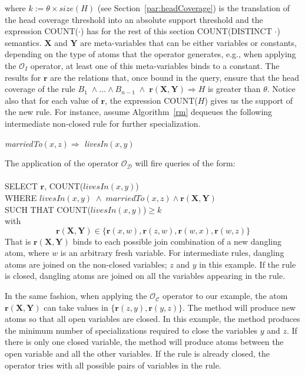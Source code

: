 \noindent where $k := \theta \times size(H)$ (see Section~\ref{par:headCoverage}) is the translation of the
head coverage threshold into an absolute support threshold and the expression COUNT($\cdot$) has for the rest of this section COUNT(DISTINCT $\cdot$) semantics.
$\bm{X}$ and $\bm{Y}$ are meta-variables that
can be either variables or constants, 
depending on the type of atoms that the operator generates, e.g., when applying the $\mathcal{O}_I$ operator, 
at least one of this meta-variables binds to a constant.
The results for $\bm{r}$ are the relations that, once bound in the query, ensure that the head coverage 
of the rule $B_1 \; \wedge ... \wedge B_{n-1} \;\wedge\; \bm{r}(\bm{X},\bm{Y}) \Rightarrow H$ is greater than $\theta$.
Notice also that for each value of $\bm{r}$, the expression COUNT($H$) gives us the support of the new rule.
For instance, assume Algorithm~\ref{rm} dequeues the following intermediate non-closed rule for further specialization.

\begin{center}
\emph{marriedTo}$(x,z) \Rightarrow $ \emph{livesIn}$(x,y)$
\end{center}

\noindent
The application of the operator $\mathcal{O_D}$ will fire queries of the form:\\ \\
SELECT $\bm{r}$, COUNT($livesIn(x,y)$) \\
WHERE $livesIn(x,y) \; \wedge \; marriedTo(x,z) \wedge \bm{r}(\bm{X}, \bm{Y})$\\
SUCH THAT COUNT($livesIn(x,y)$)$\ge k$\\

\noindent with 
\[
\bm{r}(\bm{X}, \bm{Y}) \in \{\bm{r}(x,w), \bm{r}(z,w), \bm{r}(w,x), \bm{r}(w,z) \}
\]
That is $\bm{r}(\bm{X}, \bm{Y})$ binds to each possible join combination of a new dangling atom,
where $w$ is an arbitrary fresh variable. For intermediate rules, dangling atoms are joined on the non-closed variables; 
$z$ and $y$ in this example.
If the rule is closed, dangling atoms are joined on all the variables appearing in the rule.

In the same fashion, when applying the $\mathcal{O_C}$ operator to our example, the atom $\bm{r}(\bm{X}, \bm{Y})$ 
can take values in $\{ \bm{r}(z,y), \bm{r}(y,z) \}$.
The method will produce new atoms so that all open variables are closed. In this example, the method produces the minimum number
of specializations required to close the variables $y$ and $z$. If there is only one closed variable, the method will produce atoms between
the open variable and all the other variables. If the rule is already closed, the operator tries with
all possible pairs of variables in the rule.


